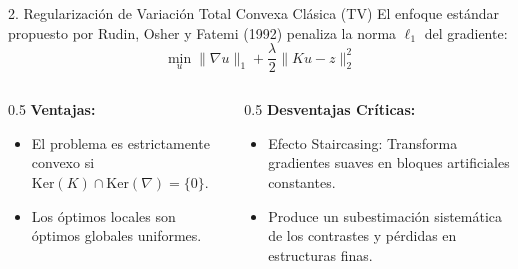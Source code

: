 \documentclass[aspectratio=169,11pt]{beamer}
\begin{document}
\begin{frame}{2. Regularización de Variación Total Convexa Clásica (TV)}
    El enfoque estándar propuesto por Rudin, Osher y Fatemi (1992) penaliza la norma $\ell_1$ del gradiente:
    \begin{equation}
        \min_{u} \| \nabla u \|_1 + \frac{\lambda}{2} \|Ku - z\|_2^2
    \end{equation}
    \begin{columns}
        \begin{column}{0.5\textwidth}
            \textbf{Ventajas:}
            \begin{itemize}
                \item El problema es estrictamente convexo si $\text{Ker}(K) \cap \text{Ker}(\nabla) = \{0\}$.
                \item Los óptimos locales son óptimos globales uniformes.
            \end{itemize}
        \end{column}
        \begin{column}{0.5\textwidth}
            \textbf{Desventajas Críticas:}
            \begin{itemize}
                \item \alert{Efecto Staircasing:} Transforma gradientes suaves en bloques artificiales constantes.
                \item Produce un subestimación sistemática de los contrastes y pérdidas en estructuras finas.
            \end{itemize}
        \end{column}
    \end{columns}
\end{frame}
\end{document}
